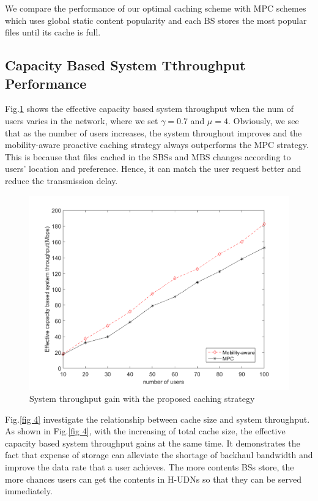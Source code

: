 \documentclass[conference]{IEEEtran}
\begin{document}
We compare the performance of our optimal caching scheme with MPC schemes which uses global static content popularity and each BS stores the most popular files until its cache is full\cite{6600983}.
\subsection{Capacity Based System Tthroughput Performance}
  Fig.\ref{fig 3} shows the effective capacity based system throughput when the num of users varies in the network, where we set $\gamma=0.7$ and $\mu=4$. Obviously, we see that as the number of users increases, the system throughout improves and the mobility-aware proactive caching strategy always outperforms the MPC strategy. This is because that files cached in the SBSs and MBS changes according to users’ location and preference. Hence, it can match the user request better and reduce the transmission delay.
\begin{figure}[htbp]
 \centerline{\includegraphics[scale=0.35]{fig3.png}}
 \caption{System throughput gain with the proposed caching strategy}
 \label{fig 3}
\end{figure}
Fig.\ref{fig 4} investigate the relationship between cache size and system throughput. As shown in Fig.\ref{fig 4}, with the increasing of total cache size, the effective capacity based system throughput gains at the same time. It demonstrates the fact that expense of storage can alleviate the shortage of backhaul bandwidth and improve the data rate that a user achieves. The more contents BSs store, the more chances users can get the contents in H-UDNs so that they can be served immediately.
\end{document}
